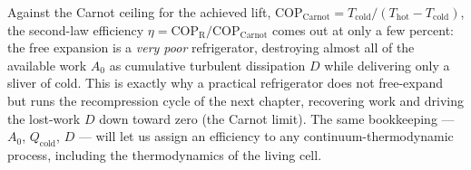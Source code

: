 Against the Carnot ceiling for the achieved lift,
$\mathrm{COP}_{\mathrm{Carnot}}=T_{\mathrm{cold}}/(T_{\mathrm{hot}}-T_{\mathrm{cold}})$,
the second-law efficiency $\eta=\mathrm{COP}_{\mathrm R}/\mathrm{COP}_{\mathrm{Carnot}}$ comes
out at only a few percent: the free expansion is a \emph{very poor} refrigerator,
destroying almost all of the available work $A_0$ as cumulative turbulent
dissipation $D$ while delivering only a sliver of cold. This is exactly why a
practical refrigerator does not free-expand but runs the recompression cycle of
the next chapter, recovering work and driving the lost-work $D$ down toward zero
(the Carnot limit). The same bookkeeping --- $A_0$, $Q_{\mathrm{cold}}$, $D$ ---
will let us assign an efficiency to any continuum-thermodynamic process,
including the thermodynamics of the living cell.

